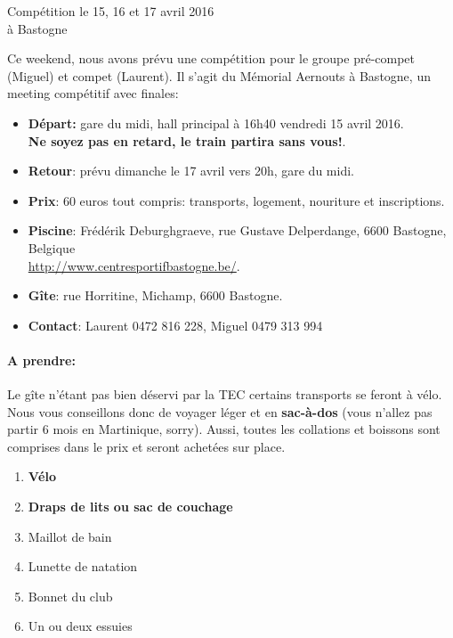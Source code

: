 \documentclass{article}
\begin{document}
\begin{center}\huge{Compétition le 15, 16 et 17 avril 2016\\à Bastogne}\end{center}
\vspace{3cm}

Ce weekend, nous avons prévu une compétition pour le groupe pré-compet (Miguel) et compet (Laurent).
Il s'agit du Mémorial Aernouts à Bastogne, un meeting compétitif avec finales:

\begin{itemize}
\item \textbf{Départ:} gare du midi, hall principal à 16h40 vendredi 15 avril 2016.\\\textbf{Ne soyez pas en retard, le train partira sans vous!}.
\item \textbf{Retour}: prévu dimanche le 17 avril vers 20h, gare du midi.
\item \textbf{Prix}: 60 euros tout compris: transports, logement, nouriture et inscriptions.
\item \textbf{Piscine}: Frédérik Deburghgraeve, rue Gustave Delperdange, 6600 Bastogne, Belgique\\\url{http://www.centresportifbastogne.be/}.
\item \textbf{Gîte}: rue Horritine, Michamp, 6600 Bastogne.
\item \textbf{Contact}: Laurent 0472 816 228, Miguel 0479 313 994
\end{itemize}

\paragraph{A prendre:}
Le gîte n'étant pas bien déservi par la TEC certains transports se feront à vélo.
Nous vous conseillons donc de voyager léger et en \textbf{sac-à-dos} (vous n'allez pas partir 6 mois en Martinique, sorry).
Aussi, toutes les collations et boissons sont comprises dans le prix et seront achetées sur place.

\begin{enumerate}
\item \textbf{Vélo}
\item \textbf{Draps de lits ou sac de couchage}
\item Maillot de bain
\item Lunette de natation
\item Bonnet du club
\item Un ou deux essuies
\end{enumerate}
\end{document}
